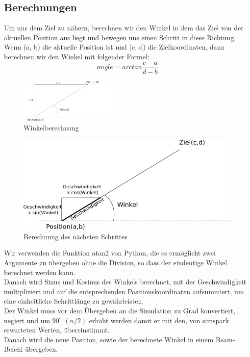 \subsection{Berechnungen}
Um uns dem Ziel zu nähern, berechnen wir den Winkel in dem das Ziel von 
der aktuellen Position aus liegt und bewegen uns einen Schritt in diese 
Richtung. \\   
Wenn (a, b) die aktuelle Position ist und (c, d) die Zielkoordinaten, dann berechnen wir den Winkel mit folgender Formel:\\
\begin{equation}
angle = arctan \frac{c - a}{d -b}
\end{equation}
\begin{figure}
\begin{center}
\includegraphics[scale=1]{180px-Winkel}
\end{center}
\caption{Winkelberechnung}
\end{figure}
\begin{figure}
\begin{center}
\includegraphics[scale=0.6]{geschwindigkeit}
\end{center}
\caption{Berechnung des nächsten Schrittes}
\end{figure}
Wir verwenden die Funktion atan2 von Python, die es ermöglicht 
zwei Argumente zu übergeben ohne die Division, so dass der eindeutige 
Winkel berechnet werden kann.\\
Danach wird Sinus und Kosinus des Winkels berechnet, mit der 
Geschwindigkeit multipliziert und auf die entsprechenden 
Positionskoordinaten aufsummiert, um eine einheitliche Schrittlänge zu 
gewährleisten.\\
Der Winkel muss vor dem Übergeben an die Simulation zu Grad 
konvertiert, negiert und um $90^\circ$ $(n/2)$ erhöht werden damit er mit den, 
von simspark erwarteten Werten, übereinstimmt.\\
Danach wird die neue Position, sowie der berechnete Winkel in einem Beam-Befehl übergeben.

